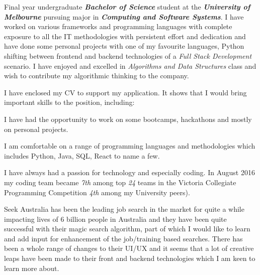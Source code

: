 \documentclass[11pt, a4paper]{awesome-cv} %
\begin{document}
\makecvheader %

\makelettertitle %


\begin{cvletter}



Final year undergraduate \textbf{\textit{Bachelor of Science}} student at the \textbf{\textit{University of Melbourne}} pursuing major in \textbf{\textit{Computing and Software Systems}}. I have worked on various frameworks and programming languages with complete exposure to all the IT methodologies with persistent effort and dedication and have done some personal projects with one of my favourite languages, Python shifting between frontend and backend technologies of a \textit{Full Stack Development} scenario. I have enjoyed and excelled in \textit{Algorithms and Data Structures} class and wish to contribute my algorithmic thinking to the company.



I have enclosed my CV to support my application. It shows that I would bring important skills to the position, including:

\begin{description}[font=$\bullet$~\normalfont\scshape\color{red!50!black}]
\item [Experience.] I have had the opportunity to work on some bootcamps, hackathons and mostly on personal projects.
\item [Skills.] I am comfortable on a range of programming languages and methodologies which includes Python, Java, SQL, React to name a few.
\item [Performance.] I have always had a passion for technology and especially coding. In August 2016 my coding team became \textit{7th} among top \textit{24} teams in the Victoria Collegiate Programming Competition \textit{4th} among my University peers).
\end{description}



Seek Australia has been the leading job search in the market for quite a while impacting lives of 6 billion people in Australia and they have been quite successful with their magic search algorithm, part of which I would like to learn and add input for enhancement of the job/training based searches. There has been a whole range of changes to their UI/UX and it seems that a lot of creative leaps have been made to their front and backend technologies which I am keen to learn more about.


\end{cvletter}
\end{document}
